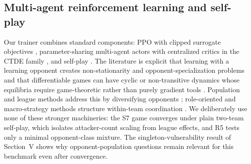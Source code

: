 \subsection{Multi-agent reinforcement learning and self-play}
Our trainer combines standard components: PPO with clipped surrogate objectives \cite{schulman2017proximal}, parameter-sharing multi-agent actors with centralized critics in the CTDE family \cite{yu2022surprising,lowe2017maddpg,foerster2018coma,rashid2018qmix,dewitt2020ippo}, and self-play \cite{heinrich2016deep,vinyals2019alphastar,berner2019dota}. The literature is explicit that learning with a learning opponent creates non-stationarity and opponent-specialization problems \cite{hernandezleal2017survey,foerster2018lola} and that differentiable games can have cyclic or non-transitive dynamics whose equilibria require game-theoretic rather than purely gradient tools \cite{balduzzi2019mechanics,lanctot2017psro}. Population and league methods address this by diversifying opponents \cite{vinyals2019alphastar,lanctot2017psro}; role-oriented and macro-strategy methods structure within-team coordination \cite{wang2020roma,wu2018moba}. We deliberately use none of these stronger machineries: the S7 game converges under plain two-team self-play, which isolates attacker-count scaling from league effects, and R5 tests only a minimal opponent-class mixture. The singleton-vulnerability result of Section~V shows why opponent-population questions remain relevant for this benchmark even after convergence.


